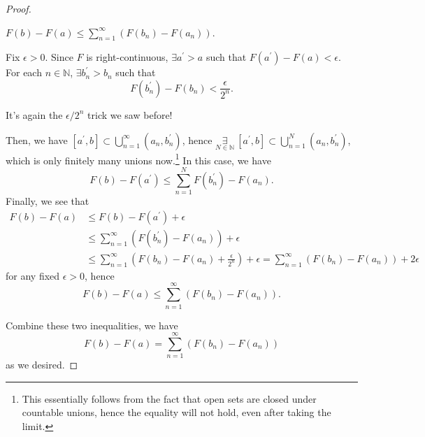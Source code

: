 \begin{proof}
	\begin{claim}
		\(F(b) - F(a) \leq \sum_{n=1}^{\infty} (F(b_{n} ) - F(a_{n} ))\).
	\end{claim}
	\begin{explanation}
		Fix \(\epsilon >0\). Since \(F\) is right-continuous, \(\exists a ^\prime > a\) such that \(F(a ^\prime ) - F(a) <\epsilon\). For each \(n\in\mathbb{N} \), \(\exists b_{n} ^\prime > b_{n}\) such that
		\[
			F(b_{n} ^\prime ) - F(b_{n})<\frac{\epsilon }{2^n}.
		\]
		\begin{remark}
			It's again the \(\epsilon /2^n\) trick we saw before!
		\end{remark}
		Then, we have \([a ^\prime , b] \subset \bigcup_{n=1}^{\infty} (a_{n}, b_{n} ^\prime )\), hence \(\underset{ N\in\mathbb{N}}{\exists}\ [a ^\prime , b]\subset \bigcup_{n=1}^{N} (a_{n}, b_{n} ^\prime )\), which is only finitely many unions now.\footnote{This essentially follows from the fact that open sets are closed under countable unions, hence the equality will not hold, even after taking the limit.} In this case, we have
		\[
			F(b) - F(a ^\prime ) \leq \sum_{n=1}^{N} F(b_{n} ^\prime ) - F(a_{n}).
		\]
		Finally, we see that
		\[
			\begin{split}
				F(b) - F(a)
				 & \leq F(b) - F(a ^\prime )+\epsilon                                                           \\
				 & \leq \sum_{n=1}^{\infty} \left(F(b_{n} ^\prime ) - F(a_{n})\right) + \epsilon                \\
				 & \leq \sum_{n=1}^{\infty} \left(F(b_{n}) - F(a_{n}) + \frac{\epsilon }{2^n}\right) + \epsilon
				= \sum_{n=1}^{\infty} \left(F(b_{n}) - F(a_{n})\right) + 2\epsilon
			\end{split}
		\]
		for any fixed \(\epsilon > 0\), hence
		\[
			F(b) - F(a) \leq \sum_{n=1}^{\infty} (F(b_{n}) - F(a_{n})).
		\]
	\end{explanation}

	Combine these two inequalities, we have
	\[
		F(b) - F(a) = \sum_{n=1}^{\infty} (F(b_{n}) - F(a_{n}))
	\]
	as we desired.
\end{proof}